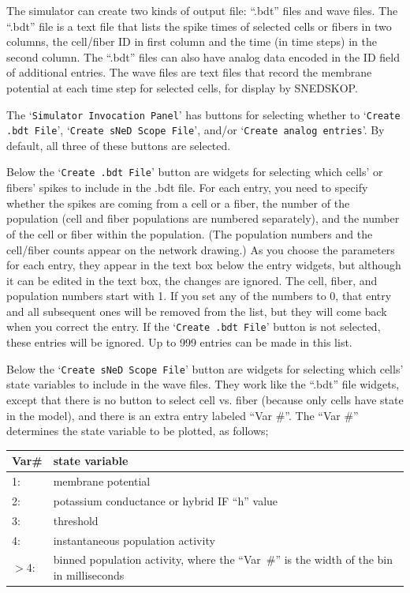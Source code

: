 \documentclass[12pt,openany,oneside]{book}
\newcommand{\tisamp}[1]{`\texttt{#1}'}
\begin{document}
The simulator can create two kinds of output file: ``.bdt'' files and
wave files.  The ``.bdt'' file is a text file that lists the spike
times of selected cells or fibers in two columns, the cell/fiber ID in
first column and the time (in time steps) in the second column.  The
``.bdt'' files can also have analog data encoded in the ID field of
additional entries.  The wave files are text files that record the
membrane potential at each time step for selected cells, for display
by SNEDSKOP.

The \tisamp{Simulator Invocation Panel} has buttons for selecting
whether to \tisamp{Create .bdt File}, \tisamp{Create sNeD Scope File},
and/or \tisamp{Create analog entries}.  By default, all three of these
buttons are selected.

Below the \tisamp{Create .bdt File} button are widgets for selecting
which cells' or fibers' spikes to include in the .bdt file.  For each
entry, you need to specify whether the spikes are coming from a cell
or a fiber, the number of the population (cell and fiber populations
are numbered separately), and the number of the cell or fiber within
the population.  (The population numbers and the cell/fiber counts
appear on the network drawing.)  As you choose the parameters for each
entry, they appear in the text box below the entry widgets, but
although it can be edited in the text box, the changes are ignored.
The cell, fiber, and population numbers start with 1.  If you set any
of the numbers to 0, that entry and all subsequent ones will be
removed from the list, but they will come back when you correct the
entry.  If the \tisamp{Create .bdt File} button is not selected, these
entries will be ignored.  Up to 999 entries can be made in this list.

Below the \tisamp{Create sNeD Scope File} button are widgets for
selecting which cells' state variables to include in the wave files.
They work like the ``.bdt'' file widgets, except that there is no
button to select cell vs. fiber (because only cells have state in the
model), and there is an extra entry labeled ``Var \#''.  The ``Var \#''
determines the state variable to be plotted, as follows;

\label{Variable Numbers}
\begin{flushleft}
\begin{tabular}{@{}lp{}@{}}
Var\# & state variable\\
\hline\noalign{\smallskip}
1: & membrane potential\\
2: & potassium conductance or hybrid IF ``h'' value\\
3: & threshold\\
4: & instantaneous population activity\\
$>$4: & binned population activity, where the ``Var~\#'' is the
width of the bin in milliseconds\\
\end{tabular}
\end{flushleft}
\end{document}
